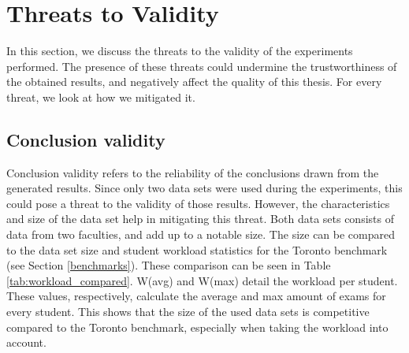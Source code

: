 
\section{Threats to Validity}\label{sec:threats}

In this section, we discuss the threats to the validity of the experiments performed. The presence of these threats could undermine the trustworthiness of the obtained results, and negatively affect the quality of this thesis. For every threat, we look at how we mitigated it.




\subsection{Conclusion validity}

Conclusion validity refers to the reliability of the conclusions drawn from the generated results. Since only two data sets were used during the experiments, this could pose a threat to the validity of those results. However, the characteristics and size of the data set help in mitigating this threat. Both data sets consists of data from two faculties, and add up to a notable size. The size can be compared to the data set size and student workload statistics for the Toronto benchmark \cite{ceschia2022} (see Section \ref{benchmarks}). These comparison can be seen in Table \ref{tab:workload_compared}. W(avg) and W(max) detail the workload per student. These values, respectively, calculate the average and max amount of exams for every student. This shows that the size of the used data sets is competitive compared to the Toronto benchmark, especially when taking the workload into account.

